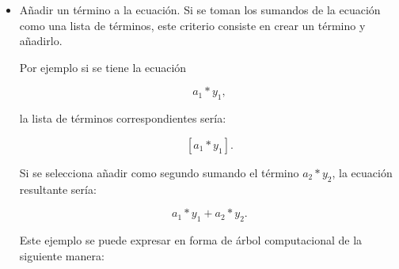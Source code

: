 \begin{itemize}
\begin{center}
\begin{adjustbox}{width=0.20\textwidth, keepaspectratio}
%
              \end{adjustbox}
          \end{center}

    \item Añadir un término a la ecuación. Si se toman los sumandos de la ecuación como una lista de términos, este criterio consiste en crear un término y añadirlo.

          Por ejemplo si se tiene la ecuación

          $$a_1 * y_1,$$

          la lista de términos correspondientes sería:

          $$[a_1*y_1].$$

          Si se selecciona añadir como segundo sumando el término $a_2 * y_2$, la ecuación resultante sería:

          $$a_1 * y_1 + a_2 * y_2.$$

          Este ejemplo se puede expresar en forma de árbol computacional de la siguiente manera:

          \begin{center}
              \begin{adjustbox}{width=0.25\textwidth, keepaspectratio}
\end{adjustbox}
\end{center}
\end{itemize}
